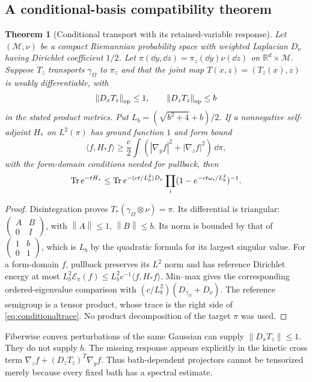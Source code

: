 \documentclass[11pt,letterpaper]{article}
\numberwithin{equation}{section}
\newtheorem{theorem}{Theorem}[section]
\theoremstyle{definition}\newtheorem{definition}[theorem]{Definition}
\theoremstyle{remark}\newtheorem{remark}[theorem]{Remark}
\newcommand{\R}{\mathbb R}\newcommand{\Z}{\mathbb Z}
\newcommand{\norm}[1]{\left\lVert #1\right\rVert}
\newcommand{\inner}[2]{\langle #1,#2\rangle}
\begin{document}
\subsection{A conditional-basis compatibility theorem}

\begin{theorem}[Conditional transport with its retained-variable response]
\label{thm:conditionaltransport}
Let $(\mathcal M,\nu)$ be a compact Riemannian probability space with weighted Laplacian $D_\nu$ having Dirichlet coefficient $1/2$. Let
$\pi(\dd y,\dd z)=\pi_z(\dd y)\nu(\dd z)$ on $\R^d\times\mathcal M$.
Suppose $T_z$ transports $\gamma_\Omega$ to $\pi_z$ and that the joint map
$T(x,z)=(T_z(x),z)$ is weakly differentiable, with
\[
 \norm{D_xT_z}_{\rm op}\le1,\qquad
 \norm{D_zT_z}_{\rm op}\le b
\]
in the stated product metrics. Put $L_b=(\sqrt{b^2+4}+b)/2$.
If a nonnegative self-adjoint $H_*$ on $L^2(\pi)$ has ground function $1$ and form bound
\[
 \inner f{H_*f}\ge\frac c2\int
 (|\nabla_yf|^2+|\nabla_zf|^2)\,\dd\pi,
\]
with the form-domain conditions needed for pullback, then
\begin{equation}
 \operatorname{Tr} e^{-tH_*}
 \le\operatorname{Tr} e^{-(ct/L_b^2)D_\nu}
      \prod_i(1-e^{-ct\omega_i/L_b^2})^{-1}.
 \label{eq:conditionaltrace}
\end{equation}
\end{theorem}
\begin{proof}
Disintegration proves $T_*(\gamma_\Omega\otimes\nu)=\pi$. Its differential is triangular:
$\left(\begin{smallmatrix}A&B\\0&I\end{smallmatrix}\right)$,
with $\norm A\le1$, $\norm B\le b$.
Its norm is bounded by that of
$\left(\begin{smallmatrix}1&b\\0&1\end{smallmatrix}\right)$, which is $L_b$ by the quadratic formula for its largest singular value. For a form-domain $f$, pullback preserves its $L^2$ norm and has reference Dirichlet energy at most $L_b^2\mathcal E_\pi(f)\le L_b^2c^{-1}\inner f{H_*f}$. Min--max gives the corresponding ordered-eigenvalue comparison with $(c/L_b^2)(D_{\gamma_\Omega}+D_\nu)$. The reference semigroup is a tensor product, whose trace is the right side of \eqref{eq:conditionaltrace}. No product decomposition of the target $\pi$ was used.
\end{proof}

Fiberwise convex perturbations of the same Gaussian can supply $\norm{D_xT_z}\le1$. They do not supply $b$. The missing response appears explicitly in the kinetic cross term
$\nabla_zf+(D_zT_z)^T\nabla_yf$. Thus bath-dependent projectors cannot be tensorized merely because every fixed bath has a spectral estimate.
\end{document}
